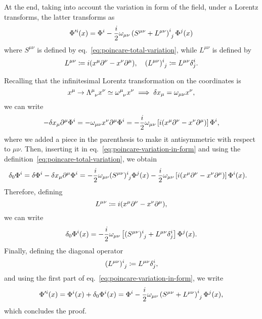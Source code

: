 At the end, taking into account the variation in form of the field, under a Lorentz transforms, the latter transforms as
\begin{equation}
    \Phi'^i(x) = \Phi^i - \frac{i}{2} \omega_{\mu\nu} \tensor{\left(S^{\mu\nu} + L^{\mu\nu}\right)}{^i_j} \Phi^j (x)
\end{equation}
where ${S}^{\mu\nu}$ is defined by eq.~\eqref{eq:poincare-total-variation}, while ${L}^{\mu\nu}$ is defined by
\begin{equation}
    {{L}}^{\mu\nu} \coloneq i (x^\mu \de^\nu - x^\nu \de^\mu), \quad  \tensor{(L^{\mu\nu})}{^i_j} \coloneq L^{\mu\nu} \delta^i_j.
\end{equation}

\begin{mdframed}
\begin{innerproof}
    Recalling that the infinitesimal Lorentz transformation on the coordinates is
    \begin{equation*}
        x^\mu \to \tensor{\Lambda}{^\mu_\nu}x^\nu \simeq \tensor{\omega}{^\mu_\nu}x^\nu \implies \delta x_\mu = \omega_{\mu\nu}x^\nu ,
    \end{equation*}
    we can write
    \begin{equation*}
        -\delta x_\mu \partial^\mu \Phi^i = - \omega_{\mu\nu} x^\nu \partial^\mu \Phi^i = -\frac{i}{2} \omega_{\mu\nu} \left[ i (x^\mu \partial^\nu - x^\nu \partial^\mu) \right] \Phi^i ,
    \end{equation*}
    where we added a piece in the parenthesis to make it antisymmetric with respect to $\mu\nu$. Then, inserting it in eq.~\eqref{eq:poincare-variation-in-form} and using the definition~\eqref{eq:poincare-total-variation}, we obtain
    \begin{align*}
        \delta_0 \Phi^i = \delta \Phi^i - \delta x_\mu \de^\mu \Phi^i &= -\frac{i}{2} \omega_{\mu\nu} \tensor{(S^{\mu\nu})}{^i_j} \Phi^j(x) -\frac{i}{2} \omega_{\mu\nu} \left[ i (x^\mu \de^\nu - x^\nu \de^\mu) \right] \Phi^i (x).
    \end{align*}
    Therefore, defining
    \begin{equation*}
        {{L}}^{\mu\nu} \coloneq i (x^\mu \partial^\nu - x^\nu \partial^\mu) ,
    \end{equation*}
    we can write
    \begin{equation*}
        \delta_0 \Phi^i (x) = -\frac{i}{2} \omega_{\mu\nu} \left[ \tensor{(S^{\mu\nu})}{^i_j} + L^{\mu\nu} \delta^i_j \right] \Phi^j (x).
    \end{equation*}
    Finally, defining the diagonal operator 
    \begin{equation*}
        \tensor{(L^{\mu\nu})}{^i_j} \coloneq L^{\mu\nu} \delta^i_j,
    \end{equation*}
    and using the first part of eq.~\eqref{eq:poincare-variation-in-form}, we write
    \begin{equation*}
        \Phi'^i(x) = \Phi^i(x) + \delta_0 \Phi^i (x) = \Phi^i - \frac{i}{2} \omega_{\mu\nu} \tensor{\left(S^{\mu\nu} + L^{\mu\nu}\right)}{^i_j} \Phi^j (x),
    \end{equation*}
    which concludes the proof.
\end{innerproof}
\end{mdframed}


